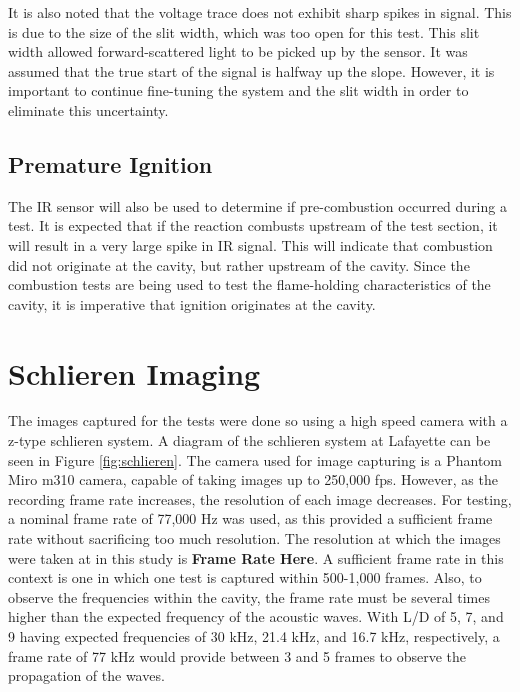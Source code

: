 It is also noted that the voltage trace does not exhibit sharp spikes in signal. This is due to the size of the slit width, which was too open for this test. This slit width allowed forward-scattered light to be picked up by the sensor. It was assumed that the true start of the signal is halfway up the slope. However, it is important to continue fine-tuning the system and the slit width in order to eliminate this uncertainty.

\subsection{Premature Ignition}

The IR sensor will also be used to determine if pre-combustion occurred during a test. It is expected that if the reaction combusts upstream of the test section, it will result in a very large spike in IR signal. This will indicate that combustion did not originate at the cavity, but rather upstream of the cavity. Since the combustion tests are being used to test the flame-holding characteristics of the cavity, it is imperative that ignition originates at the cavity. 



\section{Schlieren Imaging}

The images captured for the tests were done so using a high speed camera with a z-type schlieren system. A diagram of the schlieren system at Lafayette can be seen in Figure \ref{fig:schlieren}. The camera used for image capturing is a Phantom Miro m310 camera, capable of taking images up to 250,000 fps. However, as the recording frame rate increases, the resolution of each image decreases. For testing, a nominal frame rate of 77,000 Hz was used, as this provided a sufficient frame rate without sacrificing too much resolution. The resolution at which the images were taken at in this study is \textbf{Frame Rate Here}. A sufficient frame rate in this context is one in which one test is captured within 500-1,000 frames. Also, to observe the frequencies within the cavity, the frame rate must be several times higher than the expected frequency of the acoustic waves. With L/D of 5, 7, and 9 having expected frequencies of 30 kHz, 21.4 kHz, and 16.7 kHz, respectively, a frame rate of 77 kHz would provide between 3 and 5 frames to observe the propagation of the waves.


